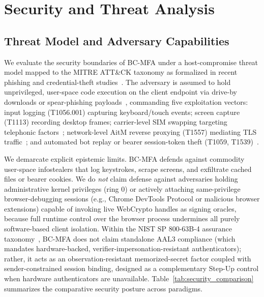 \section{Security and Threat Analysis}
\label{sec:security_analysis}

\subsection{Threat Model and Adversary Capabilities}
We evaluate the security boundaries of BC-MFA under a host-compromise threat model mapped to the MITRE ATT\&CK taxonomy as formalized in recent phishing and credential-theft studies~\cite{lain2022phishing, lee2024beneath, lim2025phishers}. The adversary is assumed to hold unprivileged, user-space code execution on the client endpoint via drive-by downloads or spear-phishing payloads~\cite{lain2022phishing}, commanding five exploitation vectors: input logging (T1056.001) capturing keyboard/touch events; screen capture (T1113) recording desktop frames; carrier-level SIM swapping targeting telephonic factors~\cite{nahapetyan2024sms}; network-level AitM reverse proxying (T1557) mediating TLS traffic~\cite{kondracki2021catching}; and automated bot replay or bearer session-token theft (T1059, T1539)~\cite{hilbig2023protect}.

We demarcate explicit epistemic limits. BC-MFA defends against commodity user-space infostealers that log keystrokes, scrape screens, and exfiltrate cached files or bearer cookies. We do \emph{not} claim defense against adversaries holding administrative kernel privileges (ring 0) or actively attaching same-privilege browser-debugging sessions (e.g., Chrome DevTools Protocol or malicious browser extensions) capable of invoking live WebCrypto handles as signing oracles, because full runtime control over the browser process undermines all purely software-based client isolation. Within the NIST SP 800-63B-4 assurance taxonomy~\cite{nist80063b4}, BC-MFA does not claim standalone AAL3 compliance (which mandates hardware-backed, verifier-impersonation-resistant authenticators); rather, it acts as an observation-resistant memorized-secret factor coupled with sender-constrained session binding, designed as a complementary Step-Up control when hardware authenticators are unavailable. Table~\ref{tab:security_comparison} summarizes the comparative security posture across paradigms.

